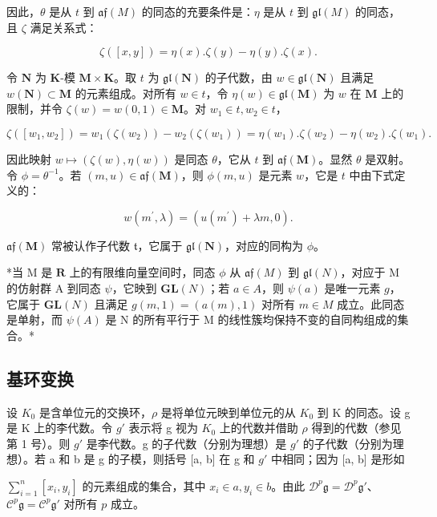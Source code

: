 因此，\(\theta\) 是从 \(t\) 到 \(\mathfrak{af}(M)\) 的同态的充要条件是：\(\eta\) 是从 \(t\) 到 \(\mathfrak{gl}(M)\) 的同态，且 \(\zeta\) 满足关系式：

\[
\zeta ([ x, y ]) = \eta (x). \zeta (y) - \eta (y). \zeta (x).\tag{13}
\]

令 \(\mathbf{N}\) 为 \(\mathbf{K}\)-模 \(\mathbf{M} \times \mathbf{K}\)。取 \(t\) 为 \(\mathfrak{gl}(\mathbf{N})\) 的子代数，由 \(w \in \mathfrak{gl}(\mathbf{N})\) 且满足 \(w(\mathbf{N}) \subset \mathbf{M}\) 的元素组成。对所有 \(w \in t\)，令 \(\eta(w) \in \mathfrak{gl}(\mathbf{M})\) 为 \(w\) 在 \(\mathbf{M}\) 上的限制，并令 \(\zeta(w) = w(0,1) \in \mathbf{M}\)。对 \(w_1 \in t, w_2 \in t\)，

\[
\zeta ([ w _ {1}, w _ {2} ]) = w _ {1} (\zeta (w _ {2})) - w _ {2} (\zeta (w _ {1})) = \eta (w _ {1}). \zeta (w _ {2}) - \eta (w _ {2}). \zeta (w _ {1}).
\]

因此映射 \(w \mapsto (\zeta(w), \eta(w))\) 是同态 \(\theta\)，它从 \(t\) 到 \(\mathfrak{af}(\mathbf{M})\)。显然 \(\theta\) 是双射。令 \(\phi = \theta^{-1}\)。若 \((m, u) \in \mathfrak{af}(\mathbf{M})\)，则 \(\phi(m, u)\) 是元素 \(w\)，它是 \(t\) 中由下式定义的：

\[
w (m ^ {\prime}, \lambda) = (u (m ^ {\prime}) + \lambda m, 0).
\]

\(\mathfrak{af}(\mathbf{M})\) 常被认作子代数 \(\mathfrak{t}\)，它属于 \(\mathfrak{gl}(\mathbf{N})\)，对应的同构为 \(\phi\)。

*当 M 是 \(\mathbf{R}\) 上的有限维向量空间时，同态 \(\phi\) 从 \(\mathfrak{af}(M)\) 到 \(\mathfrak{gl}(N)\)，对应于 M 的仿射群 A 到同态 \(\psi\)，它映到 \(\mathbf{GL}(N)\)；若 \(a \in A\)，则 \(\psi(a)\) 是唯一元素 \(g\)，它属于 \(\mathbf{GL}(N)\) 且满足 \(g(m, 1) = (a(m), 1)\) 对所有 \(m \in M\) 成立。此同态是单射，而 \(\psi(A)\) 是 N 的所有平行于 M 的线性簇均保持不变的自同构组成的集合。*

\subsection{基环变换}

设 \(K_{0}\) 是含单位元的交换环，\(\rho\) 是将单位元映到单位元的从 \(K_{0}\) 到 K 的同态。设 g 是 K 上的李代数。令 \(g'\) 表示将 g 视为 \(K_{0}\) 上的代数并借助 \(\rho\) 得到的代数（参见第 1 号）。则 \(g'\) 是李代数。g 的子代数（分别为理想）是 \(g'\) 的子代数（分别为理想）。若 a 和 b 是 g 的子模，则括号 {[}a, b{]} 在 g 和 \(g'\) 中相同；因为 {[}a, b{]} 是形如

\(\sum_{i=1}^{n}\left[x_i,y_i\right]\) 的元素组成的集合，其中 \(x_{i}\in a,y_{i}\in b\)。由此 \(\mathcal{D}^p\mathfrak{g} = \mathcal{D}^p\mathfrak{g}'\)、\(\mathcal{C}^p\mathfrak{g} = \mathcal{C}^p\mathfrak{g}'\) 对所有 \(p\) 成立。

